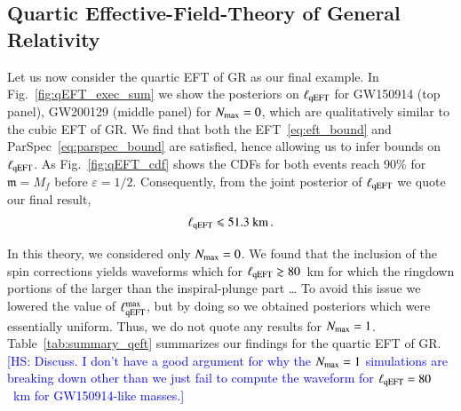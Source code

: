 \documentclass[twocolumn,
               prd,
               aps,
               superscriptaddress,
               tightenlines,
               nofootinbib,
               eqsecnum,
               amsfonts,
               amsmath,
               longbibliography]{revtex4-1}
\newcommand{\gm}{\mathfrak{m}}
\newcommand{\hs}[1]{{\textcolor{blue}{{[HS: #1]}} }}
\begin{document}
\subsection{Quartic Effective-Field-Theory of General Relativity}
\label{sec:results_qeft}

Let us now consider the quartic EFT of GR as our final example.
%
In Fig.~\ref{fig:qEFT_exec_sum} we show the posteriors on $\ell_{\rm qEFT}$ for GW150914 (top panel),
GW200129 (middle panel) for $N_{\rm max} = 0$, which are qualitatively similar to the cubic EFT of GR.
%
We find that both the EFT~\eqref{eq:eft_bound} and ParSpec~\eqref{eq:parspec_bound} are satisfied,
hence allowing us to infer bounds on $\ell_{\rm qEFT}$.
%
As Fig.~\ref{fig:qEFT_cdf} shows the CDFs for both events reach 90\% for $\gm = M_f$ before $\varepsilon = 1/2$.
%
Consequently, from the joint posterior of $\ell_{\rm qEFT}$ we quote our final result,
%
\begin{equation}
    \ell_{\rm qEFT} \leqslant 51.3~\textrm{km}\,.
\end{equation}

In this theory, we considered only $N_{\rm max} = 0$. We found that the
inclusion of the spin corrections yields waveforms which for $\ell_{\rm qEFT} \gtrsim 80$~km
for which the ringdown portions of the larger than the inspiral-plunge part \dots
%
To avoid this issue we lowered the value of $\ell^{\rm max}_{\rm qEFT}$, but by doing so we obtained posteriors
which were essentially uniform. Thus, we do not quote any results for $N_{\rm max} = 1$.
%
Table~\ref{tab:summary_qeft} summarizes our findings for the quartic EFT of GR.
%
\hs{Discuss. I don't have a good argument for why the $N_{\rm max} = 1$ simulations are breaking down other than
we just fail to compute the waveform for $\ell_{\rm qEFT} = 80~$~km for GW150914-like masses.}
\end{document}
